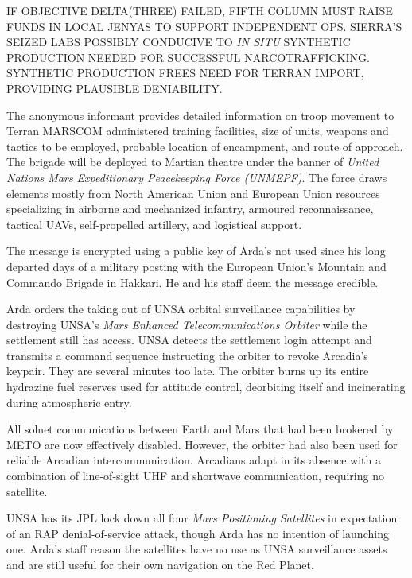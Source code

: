     \item IF OBJECTIVE DELTA(THREE) FAILED, FIFTH COLUMN MUST RAISE FUNDS IN LOCAL JENYAS TO SUPPORT INDEPENDENT OPS. SIERRA'S SEIZED LABS POSSIBLY CONDUCIVE TO {\it IN SITU} SYNTHETIC PRODUCTION NEEDED FOR SUCCESSFUL NARCOTRAFFICKING. SYNTHETIC PRODUCTION FREES NEED FOR TERRAN IMPORT, PROVIDING PLAUSIBLE DENIABILITY.
    \stopitemize
\stopitemize
\stopTimelineCorrespondenceDocument

The anonymous informant provides detailed information on troop movement to Terran MARSCOM administered training facilities, size of units, weapons and tactics to be employed, probable location of encampment, and route of approach. The brigade will be deployed to Martian theatre under the banner of {\it United Nations Mars Expeditionary Peacekeeping Force (UNMEPF)}. The force draws elements mostly from North American Union and European Union resources specializing in airborne and mechanized infantry, armoured reconnaissance, tactical UAVs, self-propelled artillery, and logistical support.

The message is encrypted using a public key of Arda's not used since his long departed days of a military posting with the European Union's Mountain and Commando Brigade in Hakkari. He and his staff deem the message credible.
\StopTimelineDate

Arda orders the taking out of UNSA orbital surveillance capabilities by destroying UNSA's {\it Mars Enhanced Telecommunications Orbiter} while the settlement still has access. UNSA detects the settlement login attempt and transmits a command sequence instructing the orbiter to revoke Arcadia's keypair. They are several minutes too late. The orbiter burns up its entire hydrazine fuel reserves used for attitude control, deorbiting itself and incinerating during atmospheric entry.

All solnet communications between Earth and Mars that had been brokered by METO are now effectively disabled. However, the orbiter had also been used for reliable Arcadian intercommunication. Arcadians adapt in its absence with a combination of line-of-sight UHF and shortwave communication, requiring no satellite.

UNSA has its JPL lock down all four {\it Mars Positioning Satellites} in expectation of an RAP denial-of-service attack, though Arda has no intention of launching one. Arda's staff reason the satellites have no use as UNSA surveillance assets and are still useful for their own navigation on the Red Planet.
\StopTimelineDate

